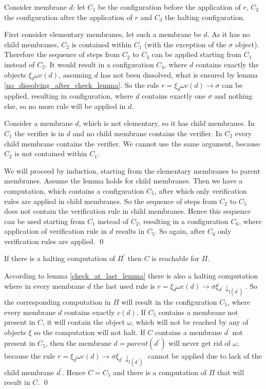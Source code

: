 \begin{dokaz}
  Consider membrane $d$: let $C_1$ be the configuration before the application of $r$, $C_2$ the configuration after the application of $r$ and $C_3$ the halting configuration.

  First consider elementary membranes, let such a membrane be $d$. As it has no child membranes, $C_2$ is contained within $C_1$ (with the exception of the $\sigma$ object). Therefore the sequence of steps from $C_2$ to $C_3$ can be applied starting from $C_1$ instead of $C_2$.
  It would result in a configuration $C_4$, where $d$ contains exactly the objects $\xi_d\omega c(d)$, assuming $d$ has not been dissolved, what is ensured by lemma \ref{no_dissolving_after_check_lemma}. So the rule $r = \xi_d\omega c(d)\rightarrow\sigma$ can be applied, resulting in configuration, where $d$ contains exactly one $\sigma$ and nothing else, so no more rule will be applied in $d$.

  Consider a membrane $d$, which is not elementary, so it has child membranes. In $C_1$ the verifier is in $d$ and no child membrane contains the verifier. In $C_2$ every child membrane contains the verifier. We cannot use the same argument, because $C_2$ is not contained within $C_1$.

  We will proceed by induction, starting from the elementary membranes to parent membranes. Assume the lemma holds for child membranes. Then we have a computation, which contains a configuration $C_5$, after which only verification rules are applied in child membranes. So the sequence of steps from $C_2$ to $C_5$ does not contain the verification rule in child membranes. Hence this sequence can be used starting from $C_1$ instead of $C_2$, resulting in a configuration $C_6$, where application of verification rule in $d$ results in $C_5$. So again, after $C_6$ only verification rules are applied.
  \qed
\end{dokaz}

\begin{lemma}
\label{if_halting_then_reachable_lemma}
  If there is a halting computation of $\Pi^\prime$ then $C$ is reachable for $\Pi$.
\end{lemma}

\begin{dokaz}
  According to lemma \ref{check_at_last_lemma} there is also a halting computation where in every membrane $d$ the last used rule is $r = \xi_d\omega c(d)\rightarrow\sigma\xi_{d^\prime}\downarrow_{l(d^\prime)}$. So the corresponding computation in $\Pi$ will result in the configuration $C_5$, where every membrane $d$ contains exactly $c(d)$. If $C_5$ contains a membrane not present in $C$, it will contain the object $\omega$, which will not be reached by any of objects $\xi$ so the computation will not halt. If $C$ contains a membrane $d^\prime$ not present in $C_5$, then the membrane $d = parent(d^\prime)$ will never get rid of $\omega$, because the rule $r = \xi_d\omega c(d)\rightarrow\sigma\xi_{d^\prime}\downarrow_{l(d^\prime)}$ cannot be applied due to lack of the child membrane $d^\prime$. Hence $C = C_5$ and there is a computation of $\Pi$ that will result in $C$. \qed
\end{dokaz}

